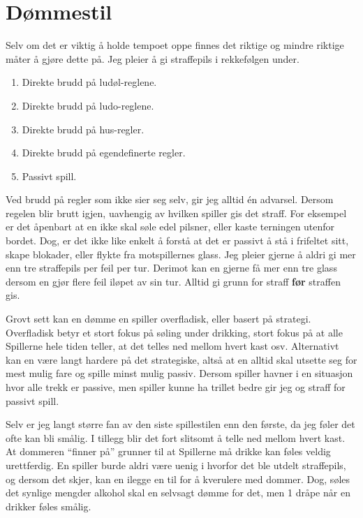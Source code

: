 \documentclass[10pt,a4paper,norsk,openany]{book}
\begin{document}
%

\section{Dømmestil}

Selv om det er viktig å holde tempoet oppe finnes det riktige og mindre riktige
måter å gjøre dette på. Jeg pleier å gi straffepils i rekkefølgen under.

\begin{enumerate}
  \item Direkte brudd på ludøl-reglene.
  \item Direkte brudd på ludo-reglene.
  \item Direkte brudd på hus-regler.
  \item Direkte brudd på egendefinerte regler.
  \item Passivt spill.
\end{enumerate}

Ved brudd på regler som ikke sier seg selv, gir jeg alltid én advarsel. Dersom
regelen blir brutt igjen, uavhengig av hvilken spiller gis det straff. For
eksempel er det åpenbart at en ikke skal søle edel pilsner, eller kaste
terningen utenfor bordet. Dog, er det ikke like enkelt å forstå at det er
passivt å stå i frifeltet sitt, skape blokader, eller flykte fra motspillernes
glass. Jeg pleier gjerne å aldri gi mer enn tre straffepils per feil per tur.
Derimot kan en gjerne få mer enn tre glass dersom en gjør flere feil iløpet av
sin tur. Alltid gi grunn for straff \textbf{før} straffen gis.

Grovt sett kan en dømme en spiller overfladisk, eller basert på strategi.
Overfladisk betyr et stort fokus på søling under drikking, stort fokus på at
alle Spillerne hele tiden teller, at det telles ned mellom hvert kast osv.
Alternativt kan en være langt hardere på det strategiske, altså at en alltid
skal utsette seg for mest mulig fare og spille minst mulig passiv. Dersom spiller
havner i en situasjon hvor alle trekk er passive, men spiller kunne ha trillet
bedre gir jeg og straff for passivt spill.

Selv er jeg langt større fan av den siste spillestilen enn den første, da jeg
føler det ofte kan bli smålig. I tillegg blir det fort slitsomt å telle ned
mellom hvert kast. At dommeren ``finner på'' grunner til at Spillerne må drikke
kan føles veldig urettferdig. En spiller burde aldri være uenig i hvorfor det
ble utdelt straffepils, og dersom det skjer, kan en ilegge en til for å
kverulere med dommer. Dog, søles det synlige mengder alkohol skal en selvsagt
dømme for det, men 1 dråpe når en drikker føles smålig. 
\end{document}

